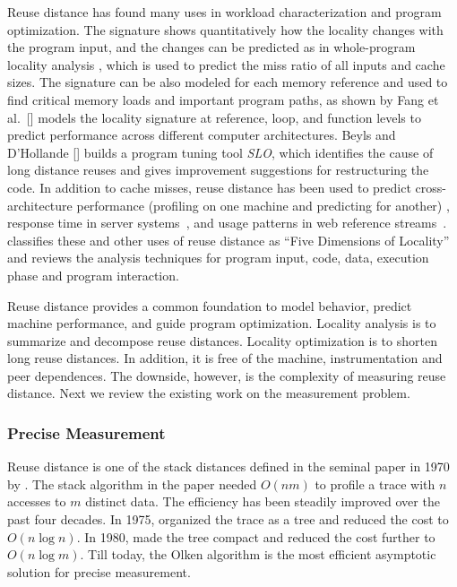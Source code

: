 Reuse distance has found many uses in workload characterization
and program optimization. The signature shows quantitatively how the
locality changes with the program input, and
the changes can be predicted as in whole-program locality analysis
\citep{Zhong+:TOPLAS09,MarinM:SIGMETRICS04,Fang+:CC06}, which is used to predict the miss ratio of all
inputs and cache sizes\citep{Zhong+:TOC07}.  The signature can be
also modeled for each memory reference and used to find critical
memory loads and important program paths, as shown by Fang et
al.~[\citeyear{Fang+:PACT05,Fang+:CC06}] \citet{MarinM:SIGMETRICS04}
models the locality signature at reference, loop, and function levels
to predict performance across different computer architectures.
Beyls and D'Hollande [\citeyear{BeylsD:HPCC06,BeylsD:CF06}] builds a
program tuning tool \emph{SLO}, which identifies the cause of long
distance reuses and gives improvement suggestions for restructuring the
code.  In addition to cache misses, reuse distance has been used to predict
cross-architecture performance (profiling on one machine and
predicting for another) \citep{MarinM:SIGMETRICS04},
response time in server systems~\citep{Kelly+:HP04}, and
usage patterns in web reference streams~\citep{Almeida+:PDIS96}. 
\citet{Zhong+:TOPLAS09} classifies these and other uses of reuse
distance as ``Five Dimensions of Locality'' and reviews the analysis
techniques for program input, code, data, execution phase and program
interaction.  

\bigskip

Reuse distance provides a common foundation to model behavior, predict
machine performance, and guide program optimization. 
Locality analysis is to summarize and decompose reuse distances.
Locality optimization is to shorten long reuse
distances.  In addition, it is free of the machine, instrumentation
and peer dependences.  The downside, however, is the complexity
of measuring reuse distance.  Next we review the existing work on
the measurement problem.

\subsubsection{Precise Measurement}
Reuse distance is one of the stack distances defined in the seminal
paper in 1970 by \citet{Mattson+:IBM70}. The stack
algorithm in the paper needed $O(nm)$ to profile a trace with $n$ accesses to $m$
distinct data.  The efficiency has been steadily improved over the
past four decades.  In 1975, \citet{BennettK:IBM75} organized
the trace as a tree and reduced the cost to $O(n \log
n)$.  In 1980, \citet{Olken:LBL81} made the
tree compact and reduced the cost further to $O(n\log m)$.  Till
today, the Olken algorithm is the most efficient asymptotic solution
for precise measurement.

